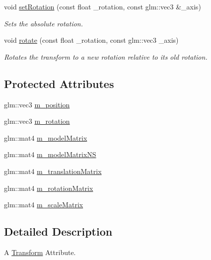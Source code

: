 \begin{DoxyCompactItemize}
void \hyperlink{class_cookie_eng_1_1_attribute_1_1_transform_a60cffb11bbd8cc354e525ad0c5880b9b}{set\+Rotation} (const float \+\_\+rotation, const glm\+::vec3 \&\+\_\+axis)
\begin{DoxyCompactList}\small\item\em Sets the absolute rotation. \end{DoxyCompactList}\item 
void \hyperlink{class_cookie_eng_1_1_attribute_1_1_transform_a8e9c5153f8b338f0fc9d79558d7280c7}{rotate} (const float \+\_\+rotation, const glm\+::vec3 \+\_\+axis)
\begin{DoxyCompactList}\small\item\em Rotates the transform to a new rotation relative to its old rotation. \end{DoxyCompactList}\end{DoxyCompactItemize}
\subsection*{Protected Attributes}
\begin{DoxyCompactItemize}
\item 
glm\+::vec3 \hyperlink{class_cookie_eng_1_1_attribute_1_1_transform_af0ca3482e5be36591a15c32ec782e2e6}{m\+\_\+position}
\item 
glm\+::vec3 \hyperlink{class_cookie_eng_1_1_attribute_1_1_transform_af77f0d8246cb5983ef8058f7bb3d3f42}{m\+\_\+rotation}
\item 
glm\+::mat4 \hyperlink{class_cookie_eng_1_1_attribute_1_1_transform_a9db58c0810064ed6a5976e5fc6089608}{m\+\_\+model\+Matrix}
\item 
glm\+::mat4 \hyperlink{class_cookie_eng_1_1_attribute_1_1_transform_a51ac04f4d2b5cf7f229f98a26aff1089}{m\+\_\+model\+Matrix\+NS}
\item 
glm\+::mat4 \hyperlink{class_cookie_eng_1_1_attribute_1_1_transform_afcc22a217351ce018b14d4216012c3a6}{m\+\_\+translation\+Matrix}
\item 
glm\+::mat4 \hyperlink{class_cookie_eng_1_1_attribute_1_1_transform_a2e1b75c0a191b33a81582a6a3fb2ff35}{m\+\_\+rotation\+Matrix}
\item 
glm\+::mat4 \hyperlink{class_cookie_eng_1_1_attribute_1_1_transform_a3eff6904a194b9b1a0cebe23cf45d98a}{m\+\_\+scale\+Matrix}
\end{DoxyCompactItemize}


\subsection{Detailed Description}
A \hyperlink{class_cookie_eng_1_1_attribute_1_1_transform}{Transform} Attribute. 

